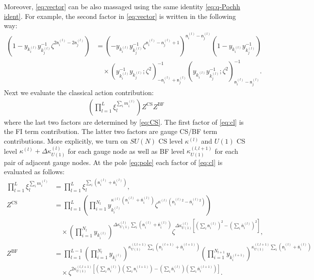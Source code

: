 \documentclass[a4paper,11pt]{article}
\begin{document}
Moreover, \eqref{eq:vector} can be also massaged using the same identity \eqref{eq:q-Pochh ident}. For example, the second factor in \eqref{eq:vector} is written in the following way:
\begin{align}
%
\left(1-y_{k^{(l)}_i} y_{k^{(l)}_j}^{-1} \zeta^{2 \mathsf n^{(l)}_i-2 \mathsf n^{(l)}_j}\right)
%
%
&= \left(-y_{k^{(l)}_i} y_{k^{(l)}_j}^{-1} \zeta^{\mathsf n^{(l)}_i-\mathsf n^{(l)}_j+1}\right)^{\mathsf n^{(l)}_i-\mathsf n^{(l)}_j} \left(1-y_{k^{(l)}_i} y_{k^{(l)}_j}^{-1}\right) \nonumber \\
&\quad \times \left(y_{k^{(l)}_i}^{-1} y_{k^{(l)}_j};\zeta^2\right)_{-\mathsf n^{(l)}_i+\mathsf n^{(l)}_j}^{-1} \left(y_{k^{(l)}_i} y_{k^{(l)}_j}^{-1};\zeta^2\right)_{\mathsf n^{(l)}_i-\mathsf n^{(l)}_j}^{-1}.
%
\end{align}
Next we evaluate the classical action contribution:
\begin{align}
\label{eq:cl}
\left(\prod_{l = 1}^L \xi_l^{\sum_i m^{(l)}_i}\right) Z^\text{CS} Z^\text{BF}
\end{align}
where the last two factors are determined by \eqref{eq:CS}. The first factor of \eqref{eq:cl} is the FI term contribution. The latter two factors are gauge CS/BF term contributions. More explicitly, we turn on $SU(N)$ CS level $\kappa^{(l)}$ and $U(1)$ CS level $\kappa^{(l)}+\Delta \kappa_{U(1)}^{(l)}$ for each gauge node as well as BF level $\kappa_{U(1)}^{(l,l+1)}$ for each pair of adjacent gauge nodes. At the pole \eqref{eq:pole} each factor of \eqref{eq:cl} is evaluated as follows:
\begin{align}
%
\prod_{l = 1}^L \xi_l^{\sum_i m^{(l)}_i} &= \prod_{l = 1}^L \xi_l^{\sum_i (\mathsf n^{(l)}_i+\mathsf{\bar n}^{(l)}_i)}, \\
%
%
Z^\text{CS} &= \prod_{l = 1}^L \left(\prod_{i = 1}^{N_l} y_{k^{(l)}_i}^{\kappa^{(l)} (\mathsf n^{(l)}_i+\mathsf{\bar n}^{(l)}_i)} \zeta^{\kappa^{(l)} (\mathsf n^{(l)}_i{}^2-\mathsf{\bar n}^{(l)}_i{}^2)}\right) \nonumber \\
%
&\quad \times \left(\prod_{i = 1}^{N_l} y_{k^{(l)}_i}\right)^{\Delta \kappa_{U(1)}^{(l)} \sum_i (\mathsf n^{(l)}_i+\mathsf{\bar n}^{(l)}_i)}  \zeta^{\Delta \kappa_{U(1)}^{(l)} [(\sum_i \mathsf n^{(l)}_i)^2-(\sum_i \mathsf{\bar n}^{(l)}_i)^2]}, \label{eq:CS1}\\
%
%
Z^\text{BF} &= \prod_{l = 1}^{L-1} \left(\prod_{i = 1}^{N_l} y_{k^{(l)}_i}\right)^{\kappa_{U(1)}^{(l,l+1)} \sum_i (\mathsf n^{(l+1)}_i+\mathsf{\bar n}^{(l+1)}_i)} \left(\prod_{i = 1}^{N_{l+1}} y_{k^{(l+1)}_i}\right)^{\kappa_{U(1)}^{(l,l+1)} \sum_i (\mathsf n^{(l)}_i+\mathsf{\bar n}^{(l)}_i)} \nonumber \\
%
&\quad \times \zeta^{2 \kappa_{U(1)}^{(l,l+1)} [(\sum_i \mathsf n^{(l)}_i) (\sum_i \mathsf n^{(l+1)}_i)-(\sum_i \mathsf{\bar n}^{(l)}_i) (\sum_i \mathsf{\bar n}^{(l+1)}_i)]}. \label{eq:CS2}
%
\end{align}
\end{document}
